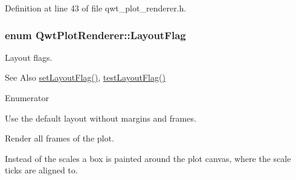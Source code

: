 Definition at line 43 of file qwt\-\_\-plot\-\_\-renderer.\-h.

\hypertarget{class_qwt_plot_renderer_a111b4db55d3f620a33e75f6b398e4b4a}{
\subsubsection[{Layout\-Flag}]{\setlength{\rightskip}{0pt plus 5cm}enum {\bf Qwt\-Plot\-Renderer\-::\-Layout\-Flag}}}\label{class_qwt_plot_renderer_a111b4db55d3f620a33e75f6b398e4b4a}


Layout flags. 

\begin{DoxySeeAlso}{See Also}
\hyperlink{class_qwt_plot_renderer_ab06e26ebf2038b55e5f30bb14c90caec}{set\-Layout\-Flag()}, \hyperlink{class_qwt_plot_renderer_a4e58ce0389b485c0d1014a13c2bdd0f7}{test\-Layout\-Flag()} 
\end{DoxySeeAlso}
\begin{Desc}
\item[Enumerator]\par
\begin{description}
\item[{\em 
\hypertarget{class_qwt_plot_renderer_a111b4db55d3f620a33e75f6b398e4b4aa7aeaacf4750595de6774ad45ba170c5d}{Default\-Layout}\label{class_qwt_plot_renderer_a111b4db55d3f620a33e75f6b398e4b4aa7aeaacf4750595de6774ad45ba170c5d}
}]Use the default layout without margins and frames. \item[{\em 
\hypertarget{class_qwt_plot_renderer_a111b4db55d3f620a33e75f6b398e4b4aa2de73b3e8c58b6603f3ef36a854436bf}{Keep\-Frames}\label{class_qwt_plot_renderer_a111b4db55d3f620a33e75f6b398e4b4aa2de73b3e8c58b6603f3ef36a854436bf}
}]Render all frames of the plot. \item[{\em 
\hypertarget{class_qwt_plot_renderer_a111b4db55d3f620a33e75f6b398e4b4aac81f7d56880ac4c03aaeab489c863a63}{Frame\-With\-Scales}\label{class_qwt_plot_renderer_a111b4db55d3f620a33e75f6b398e4b4aac81f7d56880ac4c03aaeab489c863a63}
}]Instead of the scales a box is painted around the plot canvas, where the scale ticks are aligned to. \end{description}
\end{Desc}


